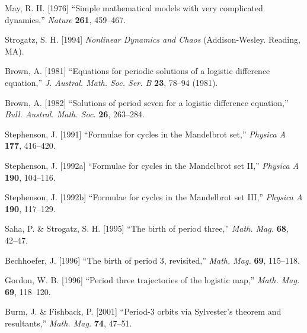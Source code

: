 \documentclass{ws-ijbc}
\begin{document}












\begin{thebibliography}{50}


  May, R. H. [1976]
  ``Simple mathematical models with very complicated dynamics,''
  {\it Nature}
  \textbf{261},
  459--467.

  Strogatz, S. H. [1994]
  {\it Nonlinear Dynamics and Chaos}
  (Addison-Wesley. Reading, MA).

  Brown, A. [1981]
  ``Equations for periodic solutions of a logistic difference equation,''
  {\it J. Austral. Math. Soc. Ser. B}
  \textbf{23},
  78--94
  (1981).

  Brown, A. [1982]
  ``Solutions of period seven for a logistic difference equation,''
  {\it Bull. Austral. Math. Soc.}
  \textbf{26},
  263--284.

  Stephenson, J. [1991]
  ``Formulae for cycles in the Mandelbrot set,''
  {\it Physica A}
  \textbf{177},
  416--420.

  Stephenson, J. [1992a]
  ``Formulae for cycles in the Mandelbrot set II,''
  {\it Physica A}
  \textbf{190},
  104--116.

  Stephenson, J. [1992b]
  ``Formulae for cycles in the Mandelbrot set III,''
  {\it Physica A}
  \textbf{190},
  117--129.

  Saha, P. \& Strogatz, S. H. [1995]
  ``The birth of period three,''
  {\it Math. Mag.}
  \textbf{68},
  42--47.

  Bechhoefer, J. [1996]
  ``The birth of period 3, revisited,''
  {\it Math. Mag.}
  \textbf{69},
  115--118.

  Gordon, W. B. [1996]
  ``Period three trajectories of the logistic map,''
  {\it Math. Mag.}
  \textbf{69},
  118--120.

  Burm, J. \& Fishback, P. [2001]
  ``Period-3 orbits via Sylvester's theorem and resultants,''
  {\it Math. Mag.}
  \textbf{74},
  47--51.


\end{thebibliography}
\end{document}
